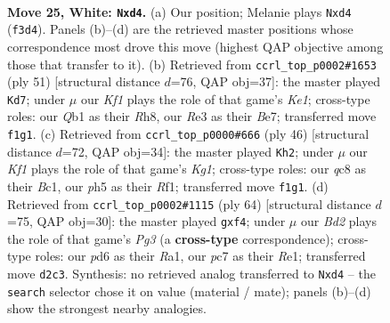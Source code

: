 \documentclass[11pt]{article}
\begin{document}
\clearpage

\begin{figure}[p]\centering
\begin{subfigure}{0.46\textwidth}\centering
\resizebox{\linewidth}{!}{%
\newchessgame
\chessboard[
  setfen={1rq2b2/n1p1r2k/p2p1pp1/3P3p/RP1pP3/4RN1P/3B1PP1/1Q3K2 w - - 0 25},
  showmover=false,
  pgfstyle=straightmove, color=movearrow, markmove={f3-d4}
]}
\caption{}
\end{subfigure}\hfill
\begin{subfigure}{0.46\textwidth}\centering
\resizebox{\linewidth}{!}{%
\newchessgame
\chessboard[
  setfen={4k2r/4bp2/2qppp2/2r4p/p4P1B/P1P4P/1P3QP1/K2RR3 b k - 0 26},
  showmover=false,
  pgfstyle=straightmove, color=movearrow, markmove={e8-d7}
]}
\caption{}
\end{subfigure}
\\[4pt]
\begin{subfigure}{0.46\textwidth}\centering
\resizebox{\linewidth}{!}{%
\newchessgame
\chessboard[
  setfen={1r5k/1p1qpp2/2p2n1b/2Pp2r1/P2P3p/2NQP2P/1R4P1/2B2RK1 w - - 0 24},
  showmover=false,
  pgfstyle=straightmove, color=movearrow, markmove={g1-h2}
]}
\caption{}
\end{subfigure}\hfill
\begin{subfigure}{0.46\textwidth}\centering
\resizebox{\linewidth}{!}{%
\newchessgame
\chessboard[
  setfen={4rr1k/1p1n1pqb/p2p3p/P1pP4/4Pp2/2N2QP1/1PB4P/R3R2K w - - 0 33},
  showmover=false,
  pgfstyle=straightmove, color=movearrow, markmove={g3-f4}
]}
\caption{}
\end{subfigure}
\caption{\textbf{Move 25, White: \texttt{Nxd4}.} (a) Our position; Melanie plays \texttt{Nxd4} (\texttt{f3d4}). Panels (b)--(d) are the retrieved master positions whose correspondence most drove this move (highest QAP objective among those that transfer to it). (b) Retrieved from \texttt{ccrl\_top\_p0002\#1653} (ply 51) [structural distance $d$=76, QAP obj=37]: the master played \texttt{Kd7}; under $\mu$ our \emph{Kf1} plays the role of that game's \emph{Ke1}; cross-type roles: our \emph{Q}b1 as their \emph{R}h8, our \emph{R}e3 as their \emph{B}e7; transferred move \texttt{f1g1}. (c) Retrieved from \texttt{ccrl\_top\_p0000\#666} (ply 46) [structural distance $d$=72, QAP obj=34]: the master played \texttt{Kh2}; under $\mu$ our \emph{Kf1} plays the role of that game's \emph{Kg1}; cross-type roles: our \emph{q}c8 as their \emph{B}c1, our \emph{p}h5 as their \emph{R}f1; transferred move \texttt{f1g1}. (d) Retrieved from \texttt{ccrl\_top\_p0002\#1115} (ply 64) [structural distance $d$=75, QAP obj=30]: the master played \texttt{gxf4}; under $\mu$ our \emph{Bd2} plays the role of that game's \emph{Pg3} (a \textbf{cross-type} correspondence); cross-type roles: our \emph{p}d6 as their \emph{R}a1, our \emph{p}c7 as their \emph{R}e1; transferred move \texttt{d2c3}. Synthesis: no retrieved analog transferred to \texttt{Nxd4} -- the \texttt{search} selector chose it on value (material / mate); panels (b)--(d) show the strongest nearby analogies.}
\label{fig:thought-m48}
\end{figure}
\end{document}
